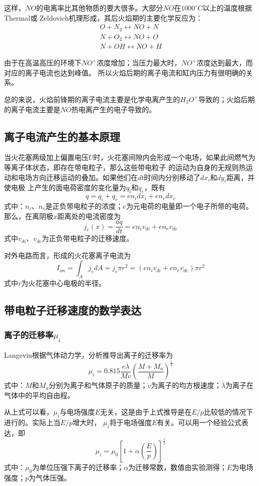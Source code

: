 这样，$NO$的电离率比其他物质的要大很多。大部分$NO$在$1000^{\circ}C$以上的温度根据Thermal或
Zeldovich\cite{zeldovich1946oxidation}机理形成，其后火焰期的主要化学反应为：
\begin{align}
O+N_{2}\longleftrightarrow NO+N\\
N+O_{2}\longleftrightarrow NO+O\\
N+OH\longleftrightarrow NO+H
\end{align}
\par
由于在高温高压的环境下$NO^{+}$浓度增加；当压力最大时，$NO^{+}$浓度达到最大，而对应的离子电流也达到峰值。
所以火焰后期的离子电流和缸内压力有很明确的关系。\par
总的来说，火焰前锋期的离子电流主要是化学电离产生的$H_{3}O^{+}$导致的；火焰后期的离子电流主要是$NO$热电离产生的电子导致的。
\subsection{离子电流产生的基本原理}
当火花塞两级加上偏置电压$U$时，火花塞间隙内会形成一个电场，如果此间燃气为等离子体状态，即存在带电粒子，那么这些带电粒子
的运动为自身的无规则热运动和电场方向迁移运动的叠加。如果他们在$dt$时间内分别移动了$dx_{i}$和$dy_{i}$距离，并使电极
上产生的面电荷密度的变化量为$q_{i}$和$q_{e}$，既有
\begin{equation}
q=q_{i}+q_{e}=en_{i}dx_{i}+en_{e}dx_{e}
\end{equation}
式中：$n_{i}$、$n_{e}$是正负带电粒子的浓度；$e$为元电荷的电量即一个电子所带的电荷。那么，在离阴极$x$距离处的电流密度为
\begin{equation}
j_{e}(x)=\frac{aq}{dt}=en_{i}v_{di}+en_{e}v_{de}
\end{equation}
式中$v_{di}$、$v_{de}$为正负带电粒子的迁移速度。\par 
对外电路而言，形成的火花塞离子电流为
\begin{equation}
I_{on}=\int_{A} j_{e}dA=j_{e}\pi r^{2}=(en_{i}v_{di}+en_{e}v_{de})\pi r^{2}
\end{equation}
式中$r$为火花塞中心电极的半径。
\subsection{带电粒子迁移速度的数学表达}
\subsubsection*{离子的迁移率$\mu_{i}$}
Langevin根据气体动力学，分析推导出离子的迁移率为
\begin{equation}
\mu_{i}=0.815\frac{e\overline{\lambda}}{M\ddot{v}}(\frac{M+M_{a}}{M})^{\frac{1}{2}}
\end{equation}
式中：$M$和$M_{a}$分别为离子和气体原子的质量；$\ddot{v}$为离子的均方根速度；$\overline{\lambda}$为离子在气体中的平均自由程。\par 
从上式可以看，$\mu_{i}$与电场强度$E$无关，这是由于上式推导是在$E/p$比较低的情况下进行的。实际上当$E/p$增大时，
$\mu_{i}$将于电场强度$E$有关。可以用一个经验公式表达，即
\begin{equation}
\mu_{i}=\mu_{0}[1+\alpha(\frac{E}{p})]^{\frac{1}{2}}
\end{equation}
式中：$\mu_{0}$为单位压强下离子的迁移率；$\alpha$为迁移常数，数值由实验测得；$E$为电场强度；$p$为气体压强。
